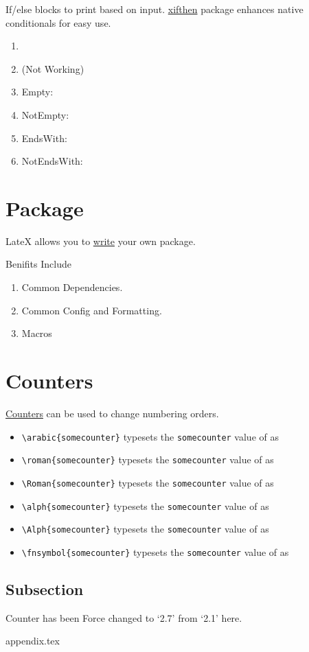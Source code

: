 \documentclass{report}[a4paper,12pt] %
\begin{document}
If/else blocks to print based on input. 
\href{https://mirror.niser.ac.in/ctan/macros/latex/contrib/xifthen/xifthen.pdf}{xifthen} package enhances native conditionals for easy use.

\begin{enumerate}
  \item {}
  \item \solution (Not Working) %
  \item Empty: 
  \item NotEmpty: 
  \item EndsWith: 
  \item NotEndsWith: 
\end{enumerate}

\section{Package}
LateX allows you to \href{https://www.overleaf.com/learn/latex/Writing_your_own_package}{write} your own package.

Benifits Include
\begin{enumerate}
  \item Common Dependencies.
  \item Common Config and Formatting.
  \item Macros
\end{enumerate}

\section{Counters}
\href{https://www.overleaf.com/learn/latex/Counters}{Counters} can be used to change numbering orders.

\setcounter{somecounter}{9}
\begin{itemize}
    \item \verb|\arabic{somecounter}| typesets the \texttt{somecounter} value of  \thesomecounter{} as  
    \item \verb|\roman{somecounter}| typesets the \texttt{somecounter} value of  \thesomecounter{} as  
    \item \verb|\Roman{somecounter}| typesets the \texttt{somecounter} value of  \thesomecounter{} as  
    \item \verb|\alph{somecounter}| typesets the \texttt{somecounter} value of  \thesomecounter{} as  
   \item \verb|\Alph{somecounter}| typesets the \texttt{somecounter} value of  \thesomecounter{} as  
    \item \verb|\fnsymbol{somecounter}| typesets the \texttt{somecounter} value of  \thesomecounter{} as  
\end{itemize}

\setcounter{subsection}{6}
\subsection{Subsection}
Counter has been Force changed to `2.7' from `2.1' here.

{appendix.tex}
\end{document}
